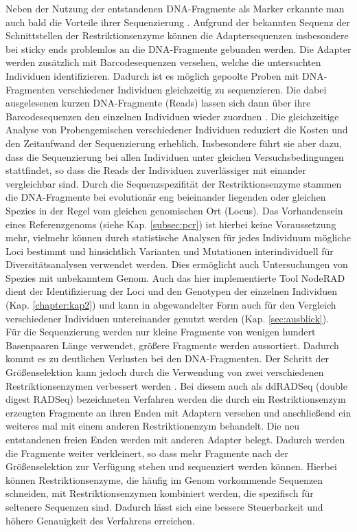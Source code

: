 Neben der Nutzung der entstandenen DNA-Fragmente als Marker erkannte man auch bald die Vorteile ihrer Sequenzierung \cite{baird_2008}. Aufgrund der bekannten Sequenz der Schnittstellen der Restriktionsenzyme können die Adaptersequenzen insbesondere bei sticky ends problemlos an die DNA-Fragmente gebunden werden. Die Adapter werden zusätzlich mit Barcodesequenzen versehen, welche die untersuchten Individuen identifizieren. Dadurch ist es möglich gepoolte Proben mit DNA-Fragmenten verschiedener Individuen gleichzeitig zu sequenzieren. Die dabei ausgelesenen kurzen DNA-Fragmente (Reads) lassen sich dann über ihre Barcodesequenzen den einzelnen Individuen wieder zuordnen \cite{davey_2010}. Die gleichzeitige Analyse von Probengemischen verschiedener Individuen reduziert die Kosten und den Zeitaufwand der Sequenzierung erheblich. Insbesondere führt sie aber dazu, dass die Sequenzierung bei allen Individuen unter gleichen Versuchsbedingungen stattfindet, so dass die Reads der Individuen zuverlässiger mit einander vergleichbar sind. Durch die Sequenzspezifität der Restriktionsenzyme stammen die DNA-Fragmente bei evolutionär eng beieinander liegenden oder gleichen Spezies in der Regel vom gleichen genomischen Ort (Locus). Das Vorhandensein eines Referenzgenoms (siehe Kap. \ref{subsec:pcr}) ist hierbei keine Voraussetzung mehr, vielmehr können durch statistische Analysen für jedes Individuum mögliche Loci bestimmt \cite{leggett_2014} und hinsichtlich Varianten und Mutationen interindividuell für Diversitätsanalysen verwendet werden. Dies ermöglicht auch Untersuchungen von Spezies mit unbekanntem Genom. Auch das hier implementierte Tool NodeRAD \cite{noderad} dient der Identifizierung der Loci und den Genotypen der einzelnen Individuen (Kap. \ref{chapter:kap2}) und kann in abgewandelter Form auch für den Vergleich verschiedener Individuen untereinander genutzt werden (Kap. \ref{sec:ausblick}).  \\

Für die Sequenzierung werden nur kleine Fragmente von wenigen hundert Basenpaaren Länge verwendet, größere Fragmente werden aussortiert. Dadurch kommt es zu deutlichen Verlusten bei den DNA-Fragmenten. Der Schritt der Größenselektion kann jedoch durch die Verwendung von zwei verschiedenen Restriktionsenzymen verbessert werden \cite{peterson_2012}. Bei diesem auch als ddRADSeq (double digest RADSeq) bezeichneten Verfahren werden die durch ein Restriktionsenzym erzeugten Fragmente an ihren Enden mit Adaptern versehen und anschließend ein weiteres mal mit einem anderen Restriktionenzym behandelt. Die neu entstandenen freien Enden werden mit anderen Adapter belegt. Dadurch werden die Fragmente weiter verkleinert, so dass mehr Fragmente nach der Größenselektion zur Verfügung stehen und sequenziert werden können. Hierbei können Restriktionsenzyme, die häufig im Genom vorkommende Sequenzen schneiden, mit Restriktionsenzymen kombiniert werden, die spezifisch für seltenere Sequenzen sind. Dadurch lässt sich eine bessere Steuerbarkeit und  höhere Genauigkeit des Verfahrens erreichen. \\

